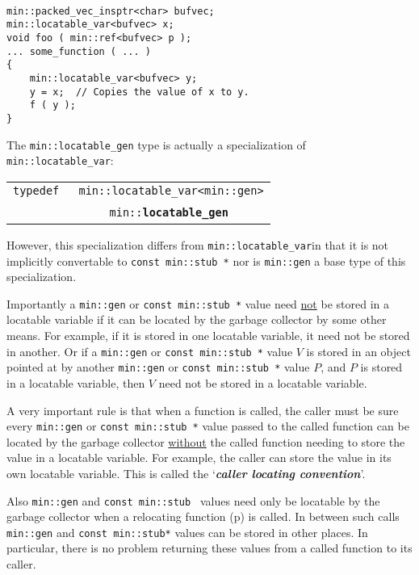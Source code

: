 \documentclass[12pt]{article}
\makeatletter
\newcommand{\key}[1]{{\bf \em #1}\index{#1}}
\newcommand{\ttindex}[1]{\index{#1@{\tt #1}}}
\newcommand{\minindex}[1]{\ttindex{min::#1}\ttindex{#1}}
\newcommand{\pagref}[1]{p\pageref{#1}}
\newcommand{\EOL}{\penalty \exhyphenpenalty}
\newenvironment{indpar}[1][0.3in]%
	{\begin{list}{}%
		     {\setlength{\itemsep}{0in}%
		      \setlength{\topsep}{0in}%
		      \setlength{\parsep}{1ex}%
		      \setlength{\labelwidth}{#1}%
		      \setlength{\leftmargin}{#1}%
		      \addtolength{\leftmargin}{\labelsep}}%
	 \item}%
	{\end{list}}
\newcommand{\LABEL}[1]{\label{#1}}
\newcommand{\ARGBREAK}{\\&{\tt ~~~~}}
\newcommand{\MINKEY}[1]{{\tt \bf #1}\minindex{#1}}
\makeatother
\begin{document}
\begin{indpar}\begin{verbatim}

min::packed_vec_insptr<char> bufvec;
min::locatable_var<bufvec> x;
void foo ( min::ref<bufvec> p );
... some_function ( ... )
{
    min::locatable_var<bufvec> y;
    y = x;  // Copies the value of x to y.
    f ( y );
}
\end{verbatim}\end{indpar}

The {\tt min::locatable\_gen} type is actually a specialization
of {\tt min::\EOL locatable\_\EOL var}:

\begin{indpar}[0.1in]\begin{tabular}{r@{}l}
\verb|typedef |
	& \verb|min::locatable_var<min::gen>|\ARGBREAK
	  \verb|min::|\MINKEY{locatable\_gen}
\LABEL{MIN::LOCATABLE_GEN_TYPEDEF} \\
\end{tabular}\end{indpar}

However, this specialization differs from
{\tt min::\EOL locatable\_\EOL var\TARG}in that it is not
implicitly convertable to {\tt const min::\EOL stub~*} nor
is {\tt min::gen} a base type of this specialization.

Importantly a \verb|min::gen| or \verb|const min::stub *|
value need \underline{not} be stored
in a locatable variable if it can be located by the garbage collector by some
other means.  For example, if it is stored in one locatable variable,
it need not be stored in another.  Or if a \verb|min::gen|
or {\tt const min::\EOL stub~*} value
$V$ is stored in an object pointed at by another \verb|min::gen|
or {\tt const min::\EOL stub~*}
value $P$, and $P$ is stored in a locatable variable, then $V$ need not
be stored in a locatable variable.

A very important rule is that when a function is called, the caller
must be sure every \verb|min::gen|
or {\tt const min::\EOL stub~*} value passed to the called
function can be located by the garbage collector \underline{without} the called
function needing to store the value in a locatable variable.
For example, the caller can store the value in its own locatable
variable.  This is called the `\key{caller locating convention}'.

Also \verb|min::gen| and {\tt const min::\EOL stub~}
values need only be locatable by
the garbage collector when a relocating function (\pagref{RELOCATING-FUNCTIONS})
is called.  In between such calls \verb|min::gen|
and {\tt const min::\EOL stub*} values can be
stored in other places.  In particular, there is no problem
returning these values from a called function to its caller.
\end{document}
